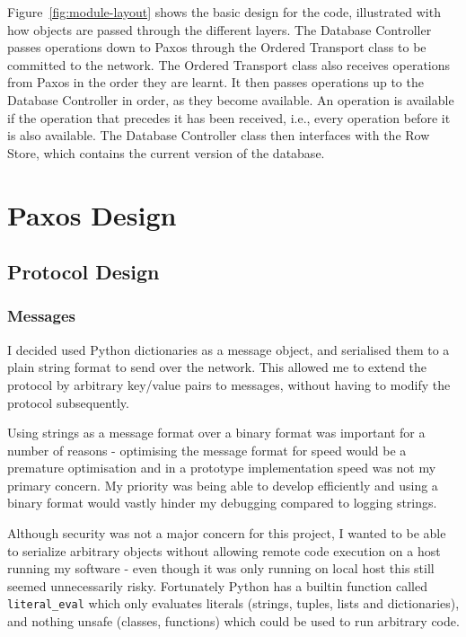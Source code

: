 \documentclass[12pt,twoside,notitlepage]{report}
\begin{document}
Figure~\ref{fig:module-layout} shows the basic design for the code, illustrated with how objects
are passed through the different layers. The Database Controller passes operations down to Paxos
through the Ordered Transport class to be committed to the network. The Ordered Transport class
also receives operations from Paxos in the order they are learnt. It then passes operations up to
the Database Controller in order, as they become available. An operation is available if the
operation that precedes it has been received, i.e., every operation before it is also available.
The Database Controller class then interfaces with the Row Store, which contains the current
version of the database.

\section{Paxos Design}

\subsection{Protocol Design}


\subsubsection*{Messages}

\label{sec:message-serialization}

I decided used Python dictionaries as a message object, and serialised them to a plain string
format to send over the network. This allowed me to extend the protocol by arbitrary key/value
pairs to messages, without having to modify the protocol subsequently.

Using strings as a message format over a binary format was important for a number of reasons -
optimising the message format for speed would be a premature optimisation and in a prototype
implementation speed was not my primary concern. My priority was being able to develop efficiently
and using a binary format would vastly hinder my debugging compared to logging strings.

Although security was not a major concern for this project, I wanted to be able to serialize
arbitrary objects without allowing remote code execution on a host running my software - even
though it was only running on local host this still seemed unnecessarily risky. Fortunately Python
has a builtin function called \verb+literal_eval+ which only evaluates literals (strings, tuples,
lists and dictionaries), and nothing unsafe (classes, functions) which could be used to run
arbitrary code.
\end{document}
